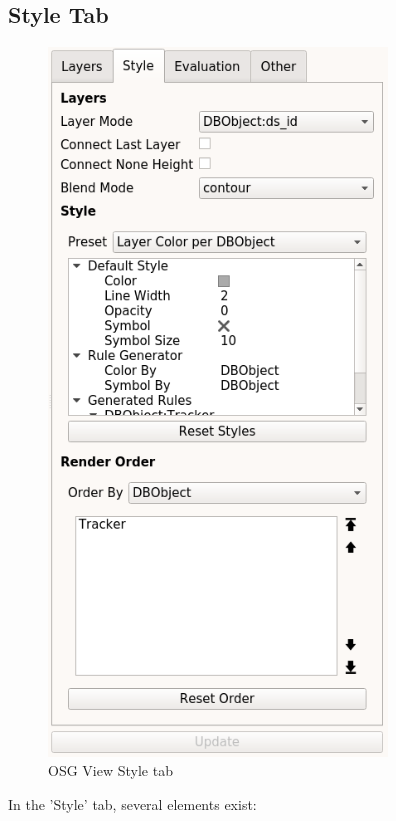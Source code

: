 \subsection{Style Tab}
\label{sec:osgview_style}

\begin{figure}[H]
   \center
    \includegraphics[width=9cm,frame]{../screenshots/osgview_style_tab.png}
  \caption{OSG View Style tab}
\end{figure}

In the 'Style' tab, several elements exist:

